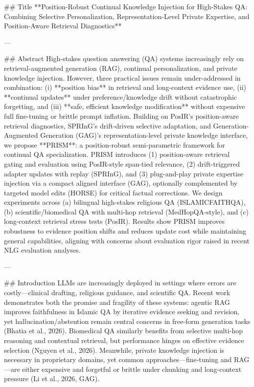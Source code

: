 ## Title  
**Position-Robust Continual Knowledge Injection for High-Stakes QA: Combining Selective Personalization, Representation-Level Private Expertise, and Position-Aware Retrieval Diagnostics**

---

## Abstract  
High-stakes question answering (QA) systems increasingly rely on retrieval-augmented generation (RAG), continual personalization, and private knowledge injection. However, three practical issues remain under-addressed in combination: (i) **position bias** in retrieval and long-context evidence use, (ii) **continual updates** under preference/knowledge drift without catastrophic forgetting, and (iii) **safe, efficient knowledge modification** without expensive full fine-tuning or brittle prompt inflation. Building on PosIR’s position-aware retrieval diagnostics, SPRInG’s drift-driven selective adaptation, and Generation-Augmented Generation (GAG)’s representation-level private knowledge interface, we propose **PRISM**: a position-robust semi-parametric framework for continual QA specialization. PRISM introduces (1) position-aware retrieval gating and evaluation using PosIR-style span-tied relevance, (2) drift-triggered adapter updates with replay (SPRInG), and (3) plug-and-play private expertise injection via a compact aligned interface (GAG), optionally complemented by targeted model edits (HORSE) for critical factual corrections. We design experiments across (a) bilingual high-stakes religious QA (ISLAMICFAITHQA), (b) scientific/biomedical QA with multi-hop retrieval (MedHopQA-style), and (c) long-context retrieval stress tests (PosIR). Results show PRISM improves robustness to evidence position shifts and reduces update cost while maintaining general capabilities, aligning with concerns about evaluation rigor raised in recent NLG evaluation analyses.  

---

## Introduction  
LLMs are increasingly deployed in settings where errors are costly—clinical drafting, religious guidance, and scientific QA. Recent work demonstrates both the promise and fragility of these systems: agentic RAG improves faithfulness in Islamic QA by iterative evidence seeking and revision, yet hallucination/abstention remain central concerns in free-form generation tasks (Bhatia et al., 2026). Biomedical QA similarly benefits from selective multi-hop reasoning and contextual retrieval, but performance hinges on effective evidence selection (Nguyen et al., 2026). Meanwhile, private knowledge injection is necessary in proprietary domains, yet common approaches—fine-tuning and RAG—are either expensive and forgetful or brittle under chunking and long-context pressure (Li et al., 2026, GAG).

